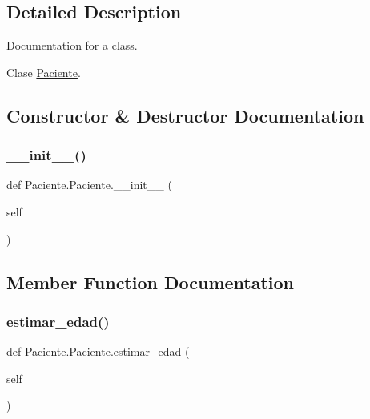 \subsection{Detailed Description}
Documentation for a class. 

Clase \mbox{\hyperlink{class_paciente_1_1_paciente}{Paciente}}. 

\subsection{Constructor \& Destructor Documentation}
\mbox{\label{class_paciente_1_1_paciente_a2c88db03c95c828f1d0f58e9d32ea355}} 
\subsubsection{\texorpdfstring{\+\_\+\+\_\+init\+\_\+\+\_\+()}{\_\_init\_\_()}}
{\footnotesize\ttfamily def Paciente.\+Paciente.\+\_\+\+\_\+init\+\_\+\+\_\+ (\begin{DoxyParamCaption}\item[{}]{self }\end{DoxyParamCaption})}



\subsection{Member Function Documentation}
\mbox{\label{class_paciente_1_1_paciente_ab86fcc6f30123b2ef9f8900835cfec67}} 
\subsubsection{\texorpdfstring{estimar\+\_\+edad()}{estimar\_edad()}}
{\footnotesize\ttfamily def Paciente.\+Paciente.\+estimar\+\_\+edad (\begin{DoxyParamCaption}\item[{}]{self }\end{DoxyParamCaption})}




